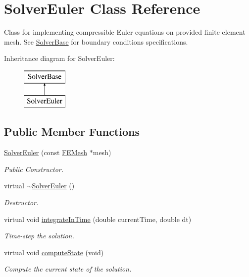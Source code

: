 \hypertarget{class_solver_euler}{}\section{Solver\+Euler Class Reference}
\label{class_solver_euler}


Class for implementing compressible Euler equations on provided finite element mesh. See \mbox{\hyperlink{class_solver_base}{Solver\+Base}} for boundary conditions specifications.  


Inheritance diagram for Solver\+Euler\+:\begin{figure}[H]
\begin{center}
\leavevmode
\includegraphics[height=2.000000cm]{class_solver_euler}
\end{center}
\end{figure}
\subsection*{Public Member Functions}
\begin{DoxyCompactItemize}
\item 
\mbox{\hyperlink{class_solver_euler_a775dd75545f3d9f69dab1c5ba2390edd}{Solver\+Euler}} (const \mbox{\hyperlink{class_f_e_mesh}{F\+E\+Mesh}} $\ast$mesh)
\begin{DoxyCompactList}\small\item\em Public Constructor. \end{DoxyCompactList}\item 
virtual \mbox{\hyperlink{class_solver_euler_a16777db2c518c46a6c41f5437376e479}{$\sim$\+Solver\+Euler}} ()
\begin{DoxyCompactList}\small\item\em Destructor. \end{DoxyCompactList}\item 
virtual void \mbox{\hyperlink{class_solver_euler_a64caa7276a35f9e5408bec75bc2d3189}{integrate\+In\+Time}} (double current\+Time, double dt)
\begin{DoxyCompactList}\small\item\em Time-\/step the solution. \end{DoxyCompactList}\item 
virtual void \mbox{\hyperlink{class_solver_euler_a5aa41447d61bd488d39ad12f97022473}{compute\+State}} (void)
\begin{DoxyCompactList}\small\item\em Compute the current state of the solution. \end{DoxyCompactList}\end{DoxyCompactItemize}



